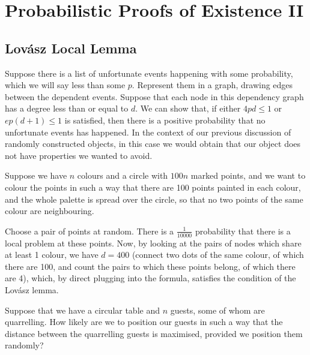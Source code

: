 \documentclass[11pt]{scrartcl}
\begin{document}
\section{Probabilistic Proofs of Existence II}

\subsection{Lov\'asz Local Lemma}

Suppose there is a list of unfortunate events happening with some
probability, which we will say less than some $p$. Represent them in a
graph, drawing edges between the dependent events. Suppose that each
node in this dependency graph has a degree less than or equal to $d$.
We can show that, if either $4pd \leq 1$ or $ep(d+1) \leq 1$ is
satisfied, then there is a positive probability that no unfortunate
events has happened. In the context of our previous discussion of
randomly constructed objects, in this case we would obtain that our
object does not have properties we wanted to avoid.
\begin{example}

  Suppose we have $n$ colours and a circle with $100n$ marked points,
  and we want to colour the points in such a way that there are 100
  points painted in each colour, and the whole palette is spread over
  the circle, so that no two points of the same colour are
  neighbouring.

  Choose a pair of points at random. There is a $\frac{1}{10000}$
  probability that there is a local problem at these points. Now, by
  looking at the pairs of nodes which share at least 1 colour, we have
  $d = 400$ (connect two dots of the same colour, of which there are
  100, and count the pairs to which these points belong, of which
  there are 4), which, by direct plugging into the formula, satisfies
  the condition of the Lov\'asz lemma.

\end{example}

\begin{exercise}

  Suppose that we have a circular table and $n$ guests, some of whom
  are quarrelling. How likely are we to position our guests in such a
  way that the distance between the quarrelling guests is maximised,
  provided we position them randomly?

\end{exercise}
\end{document}
